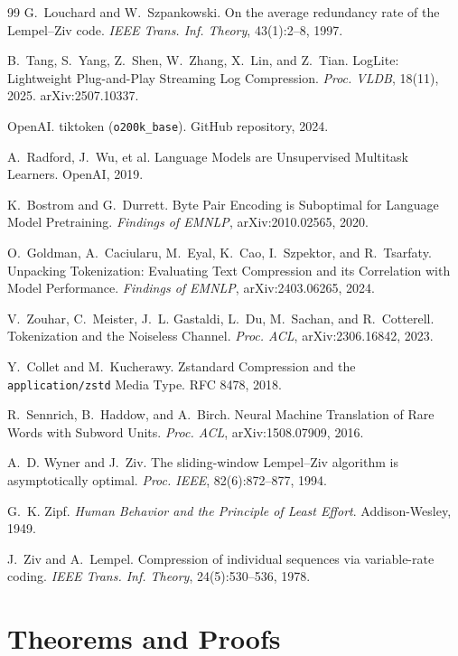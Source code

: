 \documentclass[10pt,twocolumn]{article}
\theoremstyle{plain}
\theoremstyle{definition}
\begin{document}
\begin{thebibliography}{99}
 G.~Louchard and W.~Szpankowski.
On the average redundancy rate of the Lempel--Ziv code.
\emph{IEEE Trans. Inf. Theory}, 43(1):2--8, 1997.

 B.~Tang, S.~Yang, Z.~Shen, W.~Zhang, X.~Lin, and Z.~Tian.
LogLite: Lightweight Plug-and-Play Streaming Log Compression.
\emph{Proc. VLDB}, 18(11), 2025. arXiv:2507.10337.

 OpenAI.
tiktoken (\texttt{o200k\_base}). GitHub repository, 2024.

 A.~Radford, J.~Wu, et al.
Language Models are Unsupervised Multitask Learners. OpenAI, 2019.

 K.~Bostrom and G.~Durrett.
Byte Pair Encoding is Suboptimal for Language Model Pretraining.
\emph{Findings of EMNLP}, arXiv:2010.02565, 2020.

 O.~Goldman, A.~Caciularu, M.~Eyal, K.~Cao, I.~Szpektor, and R.~Tsarfaty.
Unpacking Tokenization: Evaluating Text Compression and its Correlation with
Model Performance. \emph{Findings of EMNLP}, arXiv:2403.06265, 2024.

 V.~Zouhar, C.~Meister, J.~L. Gastaldi, L.~Du, M.~Sachan, and R.~Cotterell.
Tokenization and the Noiseless Channel. \emph{Proc. ACL}, arXiv:2306.16842, 2023.

 Y.~Collet and M.~Kucherawy.
Zstandard Compression and the \texttt{application/zstd} Media Type. RFC 8478, 2018.

 R.~Sennrich, B.~Haddow, and A.~Birch.
Neural Machine Translation of Rare Words with Subword Units.
\emph{Proc. ACL}, arXiv:1508.07909, 2016.

 A.~D. Wyner and J.~Ziv.
The sliding-window Lempel--Ziv algorithm is asymptotically optimal.
\emph{Proc. IEEE}, 82(6):872--877, 1994.

 G.~K. Zipf.
\emph{Human Behavior and the Principle of Least Effort}. Addison-Wesley, 1949.

 J.~Ziv and A.~Lempel.
Compression of individual sequences via variable-rate coding.
\emph{IEEE Trans. Inf. Theory}, 24(5):530--536, 1978.

\end{thebibliography}


\appendix
\section{Theorems and Proofs}\label{app:proofs}
\end{document}

